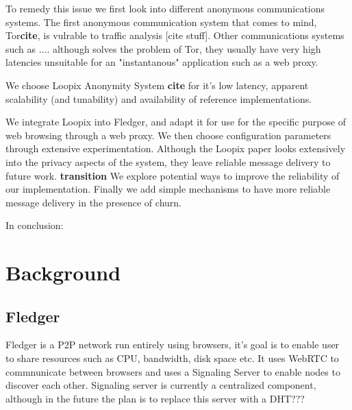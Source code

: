 \documentclass[a4paper,11pt,oneside]{report}
\begin{document}
To remedy this issue we first look into different anonymous communications systems. The first anonymous communication system that comes to mind, Tor\textbf{cite}, is vulrable to traffic analysis [cite stuff].
Other communications systems such as .... although solves the problem of Tor, they usually have very high latencies unsuitable for an "instantanous" application such as a web proxy.

We choose Loopix Anonymity System \textbf{cite} for it's low latency, apparent scalability (and tunability) and availability of reference implementations.

We integrate Loopix into Fledger, and adapt it for use for the specific purpose of web browsing through a web proxy. We then choose configuration parameters through extensive experimentation. Although the Loopix paper looks extensively into the privacy aspects of the system, they leave reliable message delivery to future work. \textbf{transition} We explore potential ways to improve the reliability of our implementation. Finally we add simple mechanisms to have more reliable message delivery in the presence of churn.

In conclusion:


\chapter{Background}



\section{Fledger}

Fledger is a P2P network run entirely using browsers, it's goal is to enable user to share resources such as CPU, bandwidth, disk space etc. It uses WebRTC to commnunicate between browsers and uses a Signaling Server to enable nodes to discover each other. Signaling server is currently a centralized component, although in the future the plan is to replace this server with a DHT???
\end{document}
